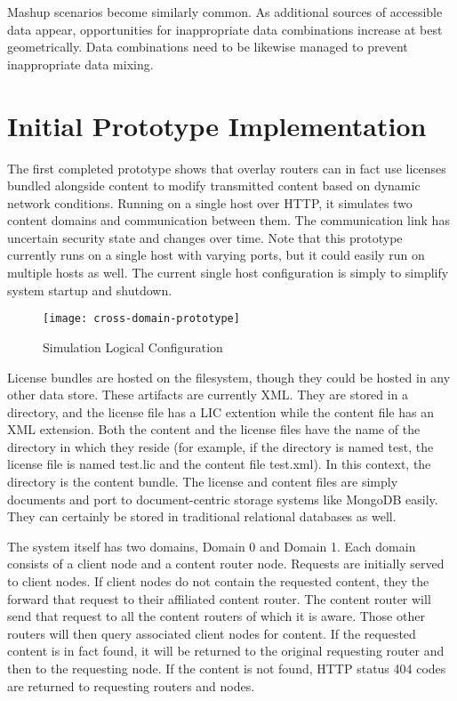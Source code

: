 Mashup scenarios become similarly common.  As additional sources of accessible data appear, opportunities for inappropriate data combinations increase at best geometrically.  Data combinations need to be likewise managed to prevent inappropriate data mixing.

\section{Initial Prototype Implementation}
The first completed prototype shows that overlay routers can in fact use licenses bundled alongside content to modify transmitted content based on dynamic network conditions.  Running on a single host over HTTP, it simulates two content domains and communication between them.  The communication link has uncertain security state and changes over time.  Note that this prototype currently runs on a single host with varying ports, but it could easily run on multiple hosts as well.  The current single host configuration is simply to simplify system startup and shutdown.

\begin{figure*}[!t]
\centering
\texttt{[image: cross-domain-prototype]}
\caption{Simulation Logical Configuration}
\label{fig:model:cross-domain-prototype}
\end{figure*}

License bundles are hosted on the filesystem, though they could be hosted in any other data store.  These artifacts are currently XML.  They are stored in a directory, and the license file has a LIC extention while the content file has an XML extension.  Both the content and the license files have the name of the directory in which they reside (for example, if the directory is named test, the license file is named test.lic and the content file test.xml).  In this context, the directory is the content bundle.  The license and content files are simply documents and port to document-centric storage systems like MongoDB easily.  They can certainly be stored in traditional relational databases as well.

The system itself has two domains, Domain 0 and Domain 1.  Each domain consists of a client node and a content router node.  Requests are initially served to client nodes.  If client nodes do not contain the requested content, they the forward that request to their affiliated content router.  The content router will send that request to all the content routers of which it is aware.  Those other routers will then query associated client nodes for content.  If the requested content is in fact found, it will be returned to the original requesting router and then to the requesting node.  If the content is not found, HTTP status 404 codes are returned to requesting routers and nodes.

